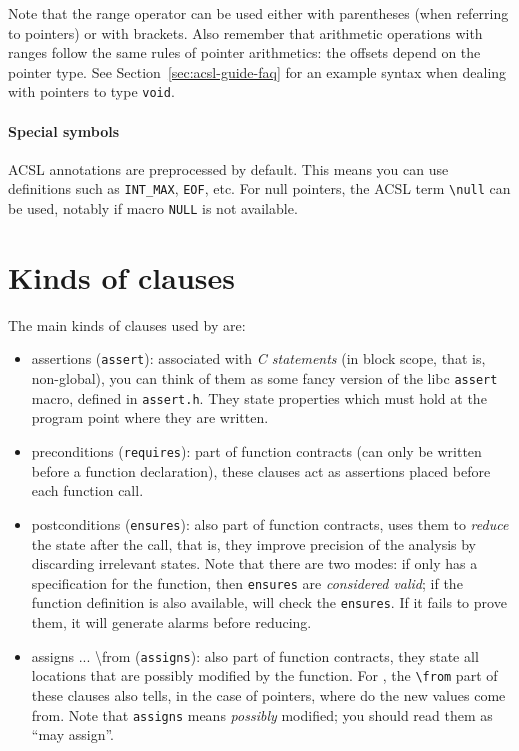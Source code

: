\documentclass{frama-c-book}
\begin{document}
Note that the range operator can be used either with parentheses
(when referring to pointers) or with brackets. Also remember that arithmetic
operations with ranges follow the same rules of pointer arithmetics:
the offsets depend on the pointer type. See Section~\ref{sec:acsl-guide-faq}
for an example syntax when dealing with pointers to type \texttt{void}.

\paragraph{Special symbols}

ACSL annotations are preprocessed by default. This means you can use
definitions such as \verb+INT_MAX+, \verb+EOF+, etc.
For null pointers, the ACSL term \verb+\null+ can be used, notably if macro
\verb+NULL+ is not available.

\section{Kinds of clauses}

The main kinds of clauses used by \Eva{} are:
\begin{itemize}
\item assertions (\texttt{assert}): associated with {\em C statements}
  (in block scope, that is, non-global), you can think of them as some
  fancy version of the libc \texttt{assert} macro, defined in
  \texttt{assert.h}. They state properties which must hold at the program
  point where they are written.
\item preconditions (\texttt{requires}): part of function contracts
  (can only be written before a function declaration), these clauses
  act as assertions placed before each function call.
\item postconditions (\texttt{ensures}): also part of function contracts,
  \Eva{} uses them to {\em reduce} the state after the call, that is, they
  improve precision of the analysis by discarding irrelevant states.
  Note that there are two modes: if \Eva{} only has a specification for the
  function, then \texttt{ensures} are {\em considered valid}; if the function
  definition is also available, \Eva{} will check the \texttt{ensures}. If it
  fails to prove them, it will generate alarms before reducing.
\item assigns ... \textbackslash{}from (\texttt{assigns}): also part of function contracts,
  they state all locations that are possibly modified by the function. For \Eva{},
  the \verb+\from+ part of these clauses also tells, in the case of pointers,
  where do the new values come from. Note that \verb+assigns+ means
  {\em possibly} modified; you should read them as ``may assign''.
\end{itemize}
\end{document}
